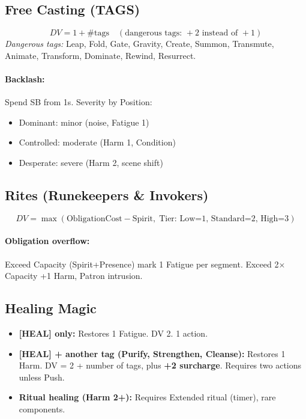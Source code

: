 \subsection*{Free Casting (TAGS)}
\[
DV = 1 + \text{\#tags} \quad(\text{dangerous tags: } +2\text{ instead of }+1)
\]
\emph{Dangerous tags:} Leap, Fold, Gate, Gravity, Create, Summon, Transmute, Animate, Transform, Dominate, Rewind, Resurrect.

\paragraph{Backlash:} Spend SB from 1s. Severity by Position:
\begin{itemize}
  \item Dominant: minor (noise, Fatigue 1)
  \item Controlled: moderate (Harm 1, Condition)
  \item Desperate: severe (Harm 2, scene shift)
\end{itemize}

\subsection*{Rites (Runekeepers \& Invokers)}
\[
DV = \max(\text{ObligationCost} - \text{Spirit},\; \text{Tier: Low=1, Standard=2, High=3})
\]
\paragraph{Obligation overflow:} Exceed Capacity (Spirit+Presence) \rightarrow mark 1 Fatigue per segment. Exceed 2× Capacity \rightarrow +1 Harm, Patron intrusion.

\subsection*{Healing Magic}
\begin{itemize}
  \item \textbf{[HEAL] only:} Restores 1 Fatigue. DV 2. 1 action.
  \item \textbf{[HEAL] + another tag (Purify, Strengthen, Cleanse):} Restores 1 Harm. DV = 2 + number of tags, plus \textbf{+2 surcharge}. Requires two actions unless Push.
  \item \textbf{Ritual healing (Harm 2+):} Requires Extended ritual (timer), rare components.
\end{itemize}

